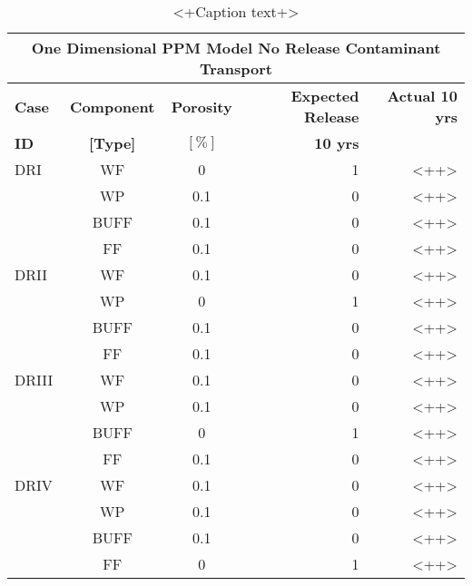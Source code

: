 \begin{table}
\centering
\footnotesize{
\begin{tabularx}{\textwidth}{|X|c|c|r|r|}
  \multicolumn{5}{c}{\textbf{One Dimensional PPM Model No Release Contaminant Transport}} \\
  \hline
  \textbf{Case}  &  \textbf{Component} &  \textbf{Porosity} & \textbf{Expected Release} & \textbf{Actual 10 yrs} \\
  \textbf{ID}    & \textbf{[Type]} &      $[\%]$            & \textbf{10 yrs}           &  \\
  \hline
  DRI     &  WF    &  0   & 1 & <++> \\
          &  WP    &  0.1 & 0 & <++> \\
          &  BUFF  &  0.1 & 0 & <++> \\
          &  FF    &  0.1 & 0 & <++> \\
  \hline
  DRII    &  WF    &  0.1 & 0 & <++> \\
          &  WP    &  0   & 1 & <++> \\
          &  BUFF  &  0.1 & 0 & <++> \\
          &  FF    &  0.1 & 0 & <++> \\
  \hline
  DRIII   &  WF    &  0.1 & 0 & <++> \\
          &  WP    &  0.1 & 0 & <++> \\
          &  BUFF  &  0   & 1 & <++> \\
          &  FF    &  0.1 & 0 & <++> \\
  \hline
  DRIV    &  WF    &  0.1 & 0 & <++> \\
          &  WP    &  0.1 & 0 & <++> \\
          &  BUFF  &  0.1 & 0 & <++> \\
          &  FF    &  0   & 1 & <++> \\
  \hline
\end{tabularx}
\caption{<+Caption text+>}
\label{tab:<+label+>}
}
\end{table}
